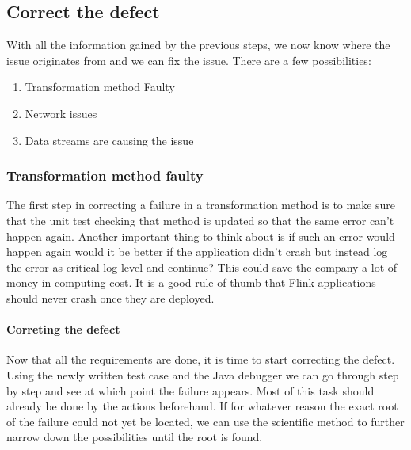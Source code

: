 \subsection{Correct the defect}
With all the information gained by the previous steps, we now know where the issue originates from and we can fix the issue. There are a few possibilities:

\begin{enumerate}
  \item[\ref{mdfCorrectTransformation}] Transformation method Faulty
  \item[\ref{mdfCorrectNetwork}] Network issues
  \item[\ref{mdfCorrectDataStreams}] Data streams are causing the issue
\end{enumerate}

\subsubsection{Transformation method faulty}
\label{mdfCorrectTransformation}
The first step in correcting a failure in a transformation method is to make sure that the unit test checking that method is updated so that the same error can't happen again. Another important thing to think about is if such an error would happen again would it be better if the application didn't crash but instead log the error as critical log level and continue? This could save the company a lot of money in computing cost. It is a good rule of thumb that Flink applications should never crash once they are deployed.

\paragraph{Correting the defect} Now that all the requirements are done, it is time to start correcting the defect. Using the newly written test case and the Java debugger we can go through step by step and see at which point the failure appears. Most of this task should already be done by the actions beforehand. If for whatever reason the exact root of the failure could not yet be located, we can use the scientific method to further narrow down the possibilities until the root is found.

